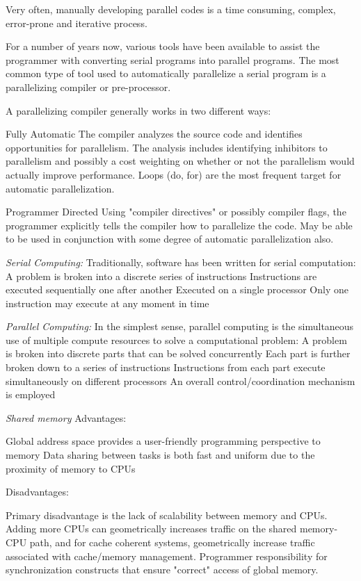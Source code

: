 Very often, manually developing parallel codes is a time consuming, complex, error-prone and iterative process.

For a number of years now, various tools have been available to assist the programmer with converting serial programs into parallel programs. The most common type of tool used to automatically parallelize a serial program is a parallelizing compiler or pre-processor.

A parallelizing compiler generally works in two different ways:

    Fully Automatic
        The compiler analyzes the source code and identifies opportunities for parallelism.
        The analysis includes identifying inhibitors to parallelism and possibly a cost weighting on whether or not the parallelism would actually improve performance.
        Loops (do, for) are the most frequent target for automatic parallelization.

    Programmer Directed
        Using "compiler directives" or possibly compiler flags, the programmer explicitly tells the compiler how to parallelize the code.
        May be able to be used in conjunction with some degree of automatic parallelization also.


\emph{Serial Computing:}
    Traditionally, software has been written for serial computation:
        A problem is broken into a discrete series of instructions
        Instructions are executed sequentially one after another
        Executed on a single processor
        Only one instruction may execute at any moment in time

\emph{Parallel Computing:}
    In the simplest sense, parallel computing is the simultaneous use of multiple compute resources to solve a computational problem:
        A problem is broken into discrete parts that can be solved concurrently
        Each part is further broken down to a series of instructions
        Instructions from each part execute simultaneously on different processors
        An overall control/coordination mechanism is employed


\emph{Shared memory}
        Advantages:

            Global address space provides a user-friendly programming perspective to memory
            Data sharing between tasks is both fast and uniform due to the proximity of memory to CPUs

        Disadvantages:

            Primary disadvantage is the lack of scalability between memory and CPUs. Adding more CPUs can geometrically increases traffic on the shared memory-CPU path, and for cache coherent systems, geometrically increase traffic associated with cache/memory management.
            Programmer responsibility for synchronization constructs that ensure "correct" access of global memory.

